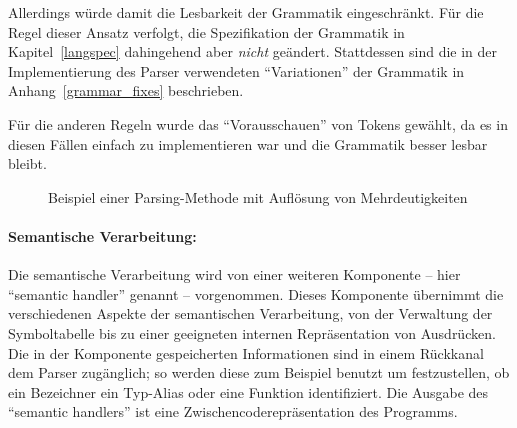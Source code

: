\documentclass[twoside,a4paper,fleqn,12pt]{book}
\begin{document}
Allerdings würde damit die Lesbarkeit der Grammatik eingeschränkt. Für die Regel  dieser Ansatz verfolgt,
die Spezifikation der Grammatik in Kapitel~\ref{langspec} dahingehend aber \emph{nicht} geändert.
Stattdessen sind die in der Implementierung des Parser verwendeten "`Variationen"' der Grammatik in Anhang~\ref{grammar_fixes} beschrieben.

Für die anderen Regeln wurde das "`Vorausschauen"' von Tokens gewählt, da es in diesen Fällen einfach zu implementieren war
und die Grammatik besser lesbar bleibt.

\begin{figure}[!h]
   \centering
  
  \caption{Beispiel einer Parsing-Methode mit Auflösung von Mehrdeutigkeiten}
  \label{fig:ParseProgramStatements}
\end{figure}

\paragraph{Semantische Verarbeitung:}
Die semantische Verarbeitung wird von einer weiteren Komponente -- hier ``semantic handler'' genannt -- vorgenommen. 
Dieses Komponente übernimmt die verschiedenen Aspekte der semantischen Verarbeitung, von der Verwaltung der
Symboltabelle bis zu einer geeigneten internen Repräsentation von Ausdrücken. Die in der Komponente gespeicherten Informationen sind
in einem Rückkanal dem Parser zugänglich; so werden diese zum Beispiel benutzt um festzustellen, ob ein Bezeichner ein
Typ-Alias oder eine Funktion identifiziert.
Die Ausgabe des ``semantic handlers'' ist eine Zwischencoderepräsentation des Programms.


\end{document}
